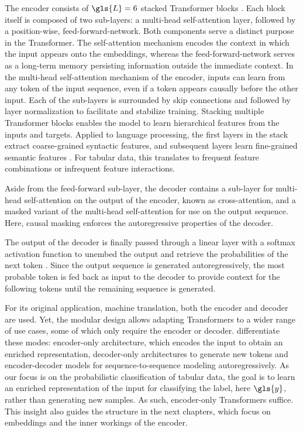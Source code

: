 The encoder consists of $\gls{L}=6$ stacked Transformer blocks \autocite[][6009]{vaswaniAttentionAllYou2017}. Each block itself is composed of two sub-layers: a multi-head self-attention layer, followed by a position-wise, \gls{feed-forward-network}. Both components serve a distinct purpose in the Transformer. The self-attention mechanism encodes the context in which the input appears onto the \glspl{embedding}, whereas the \gls{feed-forward-network} serves as a long-term memory persisting information outside the immediate context. In the multi-head self-attention mechanism of the encoder, inputs can learn from any \gls{token} of the input sequence, even if a \gls{token} appears causally before the other input. Each of the sub-layers is surrounded by skip connections \autocite[][2]{heDeepResidualLearning2015} and followed by layer normalization \autocite[][4]{baLayerNormalization2016} to facilitate and stabilize training. Stacking multiple Transformer blocks enables the model to learn hierarchical features from the inputs and targets. Applied to language processing, the first layers in the stack extract coarse-grained syntactic features, and subsequent layers learn fine-grained semantic features \autocites[][3651]{jawaharWhatDoesBERT2019}[][4596]{tenneyBERTRediscoversClassical2019}. For tabular data, this translates to frequent feature combinations or infrequent feature interactions.

Aside from the feed-forward sub-layer, the decoder contains a sub-layer for multi-head self-attention on the output of the encoder, known as cross-attention, and a masked variant of the multi-head self-attention for use on the output sequence. Here, causal masking enforces the autoregressive properties of the decoder.

The output of the decoder is finally passed through a linear layer with a softmax activation function to unembed the output and retrieve the probabilities of the next \gls{token} \autocite[][6005]{vaswaniAttentionAllYou2017}. Since the output sequence is generated autoregressively, the most probable \gls{token} is fed back as input to the decoder to provide context for the following \glspl{token} until the remaining sequence is generated.

For its original application, machine translation, both the encoder and decoder are used. Yet, the modular design allows adapting Transformers to a wider range of use cases, some of which only require the encoder or decoder. \textcite[][16--17]{raffelExploringLimitsTransfer2020} differentiate these modes: encoder-only architecture, which encodes the input to obtain an enriched representation, decoder-only architectures to generate new \glspl{token} and encoder-decoder models for sequence-to-sequence modeling autoregressively. As our focus is on the probabilistic classification of tabular data, the goal is to learn an enriched representation of the input for classifying the label, here $\gls{y}$, rather than generating new samples. As such, encoder-only Transformers suffice. This insight also guides the structure in the next chapters, which focus on \glspl{embedding} and the inner workings of the encoder.

